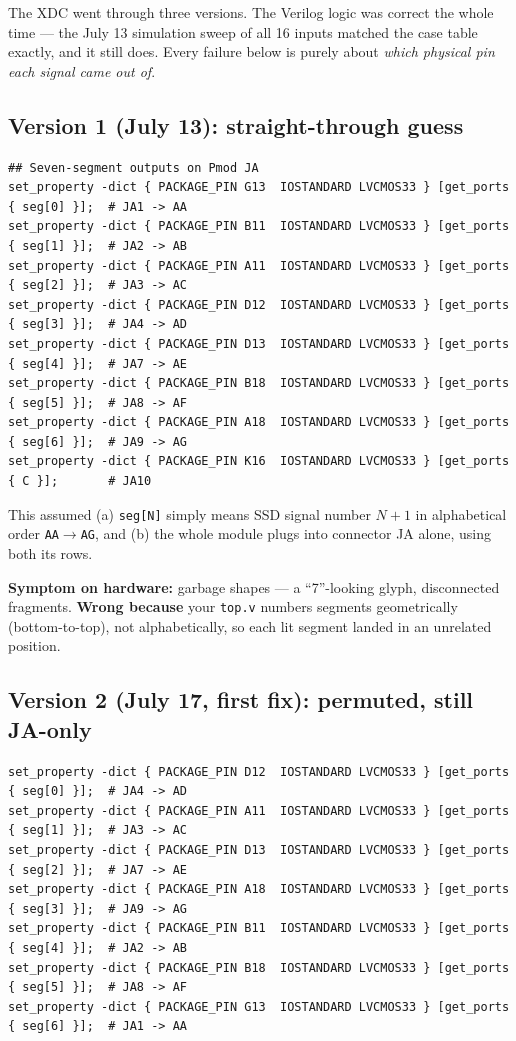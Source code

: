 \documentclass[11pt]{article}
\begin{document}
The XDC went through three versions. The Verilog logic was correct the
whole time --- the July 13 simulation sweep of all 16 inputs matched the
case table exactly, and it still does. Every failure below is purely
about \emph{which physical pin each signal came out of}.

\subsection{Version 1 (July 13): straight-through guess}

\begin{lstlisting}
## Seven-segment outputs on Pmod JA
set_property -dict { PACKAGE_PIN G13  IOSTANDARD LVCMOS33 } [get_ports { seg[0] }];  # JA1 -> AA
set_property -dict { PACKAGE_PIN B11  IOSTANDARD LVCMOS33 } [get_ports { seg[1] }];  # JA2 -> AB
set_property -dict { PACKAGE_PIN A11  IOSTANDARD LVCMOS33 } [get_ports { seg[2] }];  # JA3 -> AC
set_property -dict { PACKAGE_PIN D12  IOSTANDARD LVCMOS33 } [get_ports { seg[3] }];  # JA4 -> AD
set_property -dict { PACKAGE_PIN D13  IOSTANDARD LVCMOS33 } [get_ports { seg[4] }];  # JA7 -> AE
set_property -dict { PACKAGE_PIN B18  IOSTANDARD LVCMOS33 } [get_ports { seg[5] }];  # JA8 -> AF
set_property -dict { PACKAGE_PIN A18  IOSTANDARD LVCMOS33 } [get_ports { seg[6] }];  # JA9 -> AG
set_property -dict { PACKAGE_PIN K16  IOSTANDARD LVCMOS33 } [get_ports { C }];       # JA10
\end{lstlisting}

This assumed (a) \texttt{seg[N]} simply means SSD signal number $N{+}1$
in alphabetical order \texttt{AA}$\to$\texttt{AG}, and (b) the whole
module plugs into connector JA alone, using both its rows.

\textbf{Symptom on hardware:} garbage shapes --- a ``7''-looking glyph,
disconnected fragments. \textbf{Wrong because} your \texttt{top.v}
numbers segments geometrically (bottom-to-top), not alphabetically, so
each lit segment landed in an unrelated position.

\subsection{Version 2 (July 17, first fix): permuted, still JA-only}

\begin{lstlisting}
set_property -dict { PACKAGE_PIN D12  IOSTANDARD LVCMOS33 } [get_ports { seg[0] }];  # JA4 -> AD
set_property -dict { PACKAGE_PIN A11  IOSTANDARD LVCMOS33 } [get_ports { seg[1] }];  # JA3 -> AC
set_property -dict { PACKAGE_PIN D13  IOSTANDARD LVCMOS33 } [get_ports { seg[2] }];  # JA7 -> AE
set_property -dict { PACKAGE_PIN A18  IOSTANDARD LVCMOS33 } [get_ports { seg[3] }];  # JA9 -> AG
set_property -dict { PACKAGE_PIN B11  IOSTANDARD LVCMOS33 } [get_ports { seg[4] }];  # JA2 -> AB
set_property -dict { PACKAGE_PIN B18  IOSTANDARD LVCMOS33 } [get_ports { seg[5] }];  # JA8 -> AF
set_property -dict { PACKAGE_PIN G13  IOSTANDARD LVCMOS33 } [get_ports { seg[6] }];  # JA1 -> AA
\end{lstlisting}
\end{document}
